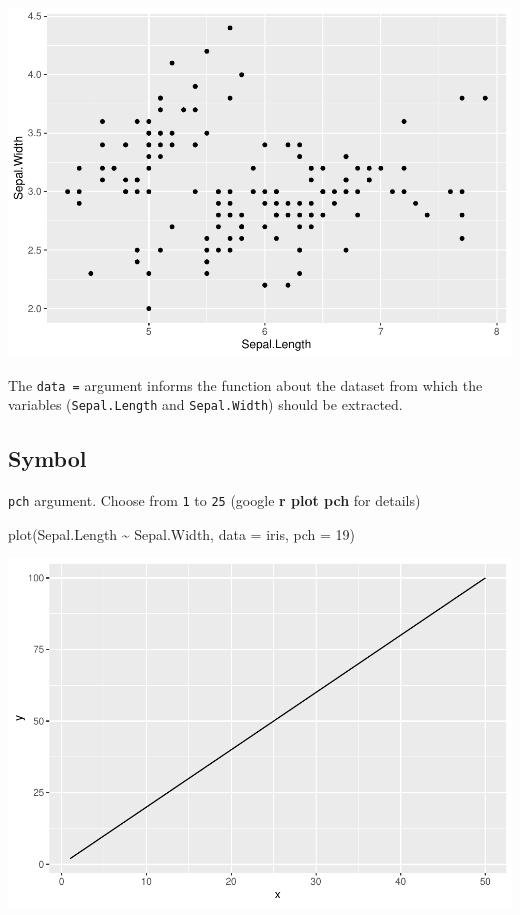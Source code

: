 \documentclass[
]{book}
\newenvironment{Shaded}{\begin{snugshade}}{\end{snugshade}}
\newcommand{\AttributeTok}[1]{\textcolor[rgb]{0.77,0.63,0.00}{#1}}
\newcommand{\DecValTok}[1]{\textcolor[rgb]{0.00,0.00,0.81}{#1}}
\newcommand{\FunctionTok}[1]{\textcolor[rgb]{0.00,0.00,0.00}{#1}}
\newcommand{\NormalTok}[1]{#1}
\newcommand{\SpecialCharTok}[1]{\textcolor[rgb]{0.00,0.00,0.00}{#1}}
\begin{document}
\begin{center}\includegraphics{biostats_files/figure-latex/unnamed-chunk-116-1} \end{center}

The \texttt{data\ =} argument informs the function about the dataset from which the variables (\texttt{Sepal.Length} and \texttt{Sepal.Width}) should be extracted.

\hypertarget{symbol}{%
\subsection{Symbol}\label{symbol}}

\texttt{pch} argument. Choose from \texttt{1} to \texttt{25} (google \textbf{r plot pch} for details)

\begin{Shaded}
\begin{Highlighting}[]
\FunctionTok{plot}\NormalTok{(Sepal.Length }\SpecialCharTok{\textasciitilde{}}\NormalTok{ Sepal.Width, }\AttributeTok{data =}\NormalTok{ iris,}
     \AttributeTok{pch =} \DecValTok{19}\NormalTok{)}
\end{Highlighting}
\end{Shaded}

\begin{center}\includegraphics{biostats_files/figure-latex/unnamed-chunk-117-1} \end{center}
\end{document}
